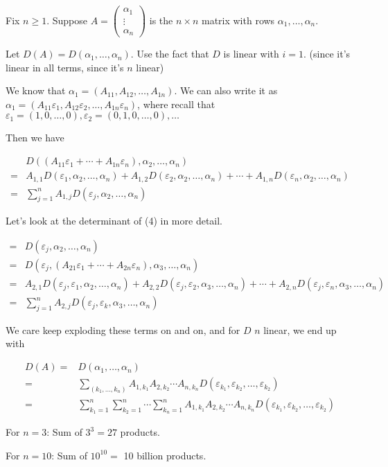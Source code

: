 \documentclass[12pt]{article}
\def\eps{\varepsilon}
\begin{document}
  {
    Fix $n \ge 1$. Suppose $A = \begin{pmatrix} \alpha_1 \\ \vdots \\ \alpha_n
    \end{pmatrix}$ is the $n \times n$ matrix with rows $\alpha_1, \dots,
    \alpha_n$.

    Let $D(A) = D(\alpha_1, \dots, \alpha_n)$. Use the fact that $D$ is linear
    with $i = 1$. (since it's linear in all terms, since it's $n$ linear)

    We know that $\alpha_1 = (A_{11}, A_{12}, \dots, A_{1n})$. We can also write
    it as $\alpha_1 = (A_{11} \eps_1, A_{12} \eps_2, \dots, A_{1n} \eps_n)$,
    where recall that $\eps_1 = (1, 0, \dots, 0), \eps_2 = (0, 1, 0, \dots, 0),
    \dots$

    Then we have

    \begin{align}
      &D((A_{11} \eps_1 + \cdots + A_{1n} \eps_n), \alpha_2, \dots, \alpha_n) \\
      =&A_{1, 1} D(\eps_1, \alpha_2, \dots, \alpha_n) + A_{1, 2} D(\eps_2, \alpha_2,
      \dots, \alpha_n) + \cdots + A_{1, n} D(\eps_n, \alpha_2, \dots, \alpha_n) \\
      =&\sum_{j = 1}^n A_{1, j} D(\eps_j, \alpha_2, \dots, \alpha_n)
    \end{align}

    Let's look at the determinant of (4) in more detail.

    \begin{align}
      =&D(\eps_j, \alpha_2, \dots, \alpha_n) \\
      =&D(\eps_j, (A_{21} \eps_1 + \cdots + A_{2n} \eps_n), \alpha_3, \dots, \alpha_n) \\
      =&A_{2, 1} D(\eps_j, \eps_1, \alpha_2, \dots, \alpha_n) + A_{2, 2}
      D(\eps_j, \eps_2, \alpha_3, \dots, \alpha_n) + \cdots + A_{2, n} D(\eps_j, \eps_n, \alpha_3, \dots, \alpha_n) \\
      =&\sum_{j = 1}^n A_{2, j} D(\eps_j, \eps_k, \alpha_3, \dots, \alpha_n)
    \end{align}

    We care keep exploding these terms on and on, and for $D$ $n$ linear, we end
    up with

    \begin{align*}
      D(A) =&D(\alpha_1, \dots, \alpha_n) \\
      =& \sum_{(k_1, \dots, k_n)} A_{1, k_1} A_{2, k_2} \cdots A_{n, k_n} D(\eps_{k_1}, \eps_{k_2}, \dots, \eps_{k_2}) \\
      =& \sum_{k_1 = 1}^n \sum_{k_2 = 1}^n \cdots \sum_{k_n = 1}^n A_{1, k_1} A_{2, k_2} \cdots A_{n, k_n} D(\eps_{k_1}, \eps_{k_2}, \dots, \eps_{k_2})
    \end{align*}

    For $n = 3$: Sum of $3^3 = 27$ products.

    For $n = 10$: Sum of $10^{10} =$ 10 billion products.
  }
\end{document}
